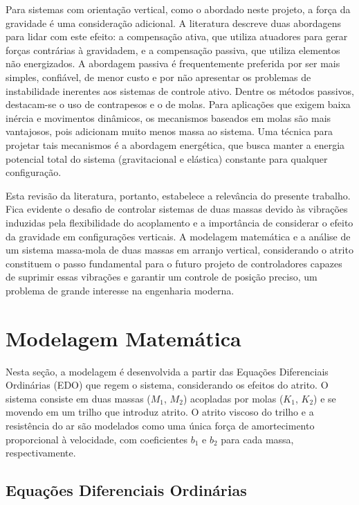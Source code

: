 \documentclass[9pt,a4paper,twocolumn,twoside]{tau-class/tau}
\begin{document}
Para sistemas com orientação vertical, como o abordado neste projeto, a força da gravidade é uma consideração adicional. A literatura descreve duas abordagens para lidar com este efeito: a compensação ativa, que utiliza atuadores para gerar forças contrárias à gravidadem, e a compensação passiva, que utiliza elementos não energizados. A abordagem passiva é frequentemente preferida por ser mais simples, confiável, de menor custo e por não apresentar os problemas de instabilidade inerentes aos sistemas de controle ativo. Dentre os métodos passivos, destacam-se o uso de contrapesos e o de molas. Para aplicações que exigem baixa inércia e movimentos dinâmicos, os mecanismos baseados em molas são mais vantajosos, pois adicionam muito menos massa ao sistema. Uma técnica para projetar tais mecanismos é a abordagem energética, que busca manter a energia potencial total do sistema (gravitacional e elástica) constante para qualquer configuração. \cite{PassiveGravity}

Esta revisão da literatura, portanto, estabelece a relevância do presente trabalho. Fica evidente o desafio de controlar sistemas de duas massas devido às vibrações induzidas pela flexibilidade do acoplamento e a importância de considerar o efeito da gravidade em configurações verticais. A modelagem matemática e a análise de um sistema massa-mola de duas massas em arranjo vertical, considerando o atrito constituem o passo fundamental para o futuro projeto de controladores capazes de suprimir essas vibrações e garantir um controle de posição preciso, um problema de grande interesse na engenharia moderna. \cite{ComparativeStudy} \cite{PassiveGravity}

\section{Modelagem Matemática}

Nesta seção, a modelagem é desenvolvida a partir das Equações Diferenciais Ordinárias (EDO) que regem o sistema, considerando os efeitos do atrito. O sistema consiste em duas massas ($M_1$, $M_2$) acopladas por molas ($K_1$, $K_2$) e se movendo em um trilho que introduz atrito. O atrito viscoso do trilho e a resistência do ar são modelados como uma única força de amortecimento proporcional à velocidade, com coeficientes $b_1$ e $b_2$ para cada massa, respectivamente.

\subsection{Equações Diferenciais Ordinárias}
\end{document}
